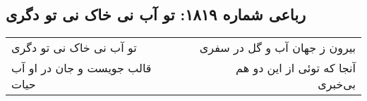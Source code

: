 \begin{center}
\section*{رباعی شماره ۱۸۱۹: تو آب نی خاک نی تو دگری}
\label{sec:1819}
\begin{longtable}{l p{0.5cm} r}
تو آب نی خاک نی تو دگری
&&
بیرون ز جهان آب و گل در سفری
\\
قالب جویست و جان در او آب حیات
&&
آنجا که توئی از این دو هم بی‌خبری
\\
\end{longtable}
\end{center}
